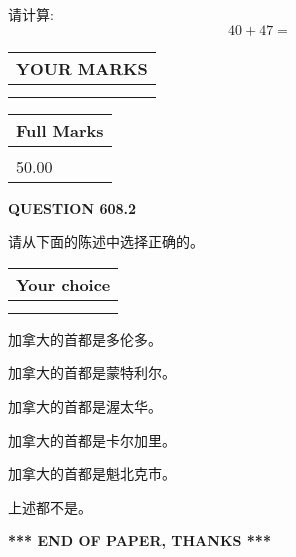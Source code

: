 \documentclass{ctexart}
\begin{document}
  
 
请计算:
\begin{equation}
40 +  %
47 = \nonumber
\end{equation}
 

 

 
  
\vspace{0.2in}
  
\noindent\begin{tabular}{|l|}
\hline
 YOUR MARKS  \\
\hline
 \\ 
 \\ 
\hline
\end{tabular}
\hspace{0.05in} \begin{tabular}{|l|}
\hline
 Full Marks  \\
\hline
 \\ 
50.00 \\
\hline
\end{tabular}
{\textbf{\Large{QUESTION
608.2 
}}}
  
  
请从下面的陈述中选择正确的。
  
  
\noindent\hspace{3.0in} \begin{tabular}{|l|}
\hline
Your choice \\
\hline
 \\ 
 \\ 
\hline
\end{tabular}
  
  
 
 
加拿大的首都是多伦多。
 
 
加拿大的首都是蒙特利尔。
 
 
加拿大的首都是渥太华。
 
 
加拿大的首都是卡尔加里。
 
 
加拿大的首都是魁北克市。
 
 
 上述都不是。
 
 
   
   
 \vspace{0.2in}
 
   
   
   
   
\vspace{1.0in} 
{\textbf{\large{ *** END OF PAPER, THANKS *** }}} 
   
\end{document}
